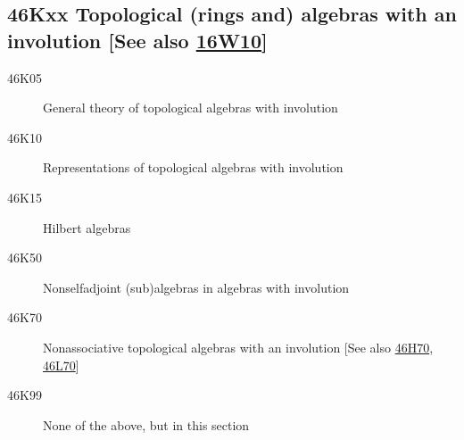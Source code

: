 \subsection*{46Kxx  Topological (rings and) algebras with an involution [See also \hyperref[16W10]{16W10}] }\label{46Kxx}
\begin{description}  
\item [46K05]\label{46K05} General theory of topological algebras with involution
\item [46K10]\label{46K10} Representations of topological algebras with involution
\item [46K15]\label{46K15} Hilbert algebras
\item [46K50]\label{46K50} Nonselfadjoint (sub)algebras in algebras with involution
\item [46K70]\label{46K70} Nonassociative topological algebras with an involution [See also \hyperref[46H70]{46H70}, \hyperref[46L70]{46L70}]
\item [46K99]\label{46K99} None of the above, but in this section
\end{description}

